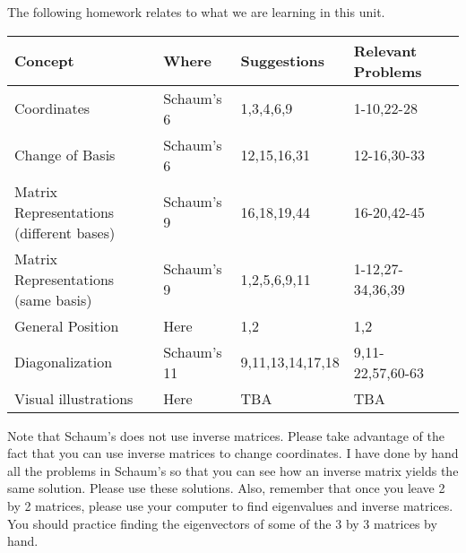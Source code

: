 The following homework relates to what we are learning in this unit.

\begin{center}
\begin{tabular}{|l|l|l|l|l|}
\hline
Concept&Where&Suggestions&Relevant Problems\\ \hline
Coordinates&Schaum's 6&1,3,4,6,9&1-10,22-28\\ \hline
Change of Basis &Schaum's 6&12,15,16,31&12-16,30-33\\ \hline
Matrix Representations (different bases)&Schaum's 9&16,18,19,44&16-20,42-45\\ \hline
Matrix Representations (same basis)&Schaum's 9&1,2,5,6,9,11&1-12,27-34,36,39\\ \hline
General Position& Here & 1,2& 1,2\\ \hline
Diagonalization&Schaum's 11&9,11,13,14,17,18&9,11-22,57,60-63\\ \hline
Visual illustrations&Here&TBA&TBA\\ \hline
\end{tabular}
\end{center}

Note that Schaum's does not use inverse matrices. Please take advantage of the fact that you can use inverse matrices to change coordinates. I have done by hand all the problems in Schaum's so that you can see how an inverse matrix yields the same solution. Please use these solutions. Also, remember that once you leave 2 by 2 matrices, please use your computer to find eigenvalues and inverse matrices.  You should practice finding the eigenvectors of some of the 3 by 3 matrices by hand.



